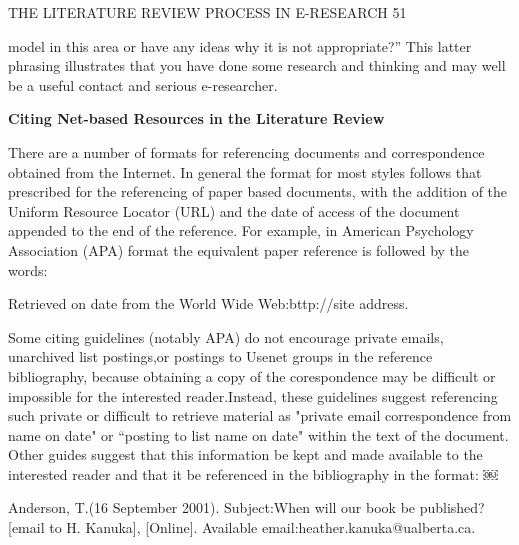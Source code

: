 \documentclass{article}
\begin{document}
\begin{flushright} 
THE LITERATURE REVIEW PROCESS IN E-RESEARCH 
\hspace{6mm}
51
\vspace{5mm} 
\end{flushright}

model in this area or have any ideas why it is not appropriate?” This latter phrasing illustrates that you have done some research and thinking and may well be a useful contact and serious e-researcher.

\vspace{5mm}
\hspace{-2cm}
\textbf{Citing Net-based Resources in the Literature Review}
\vspace{3mm}

There are a number of formats for referencing documents and correspondence obtained from the Internet. In general the format for most styles follows that prescribed for the referencing of paper based documents, with the addition of the Uniform Resource Locator (URL) and the date of access of the document appended to the end of the reference. For example, in American Psychology Association (APA) format
the equivalent paper reference is followed by the words:

\vspace{5mm}
\hspace{2cm}

Retrieved on date from the World Wide Web:bttp://site address.

\vspace{5mm}
Some citing guidelines (notably APA) do not encourage private emails, unarchived list postings,or postings to Usenet groups in the reference bibliography, because obtaining a copy of the corespondence may be difficult or impossible for the interested reader.Instead, these guidelines suggest referencing such private or difficult to retrieve material as "private email correspondence from name on date" or “posting to list name on date" within the text of the document. Other guides suggest that this information be kept and made available to the interested reader and that it be referenced in the bibliography in the format:
\vspace{5mm}
\hspace{2cm}￼

Anderson, T.(16 September 2001). Subject:When will our book be published?[email to H. Kanuka], [Online]. Available email:heather.kanuka@ualberta.ca.
\vspace{5mm}
\end{document}
